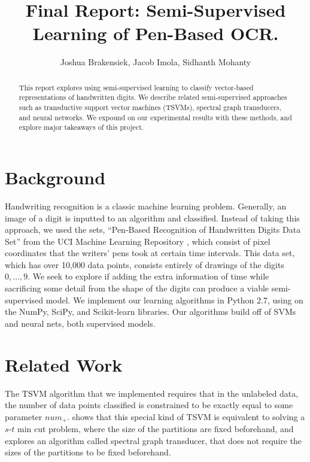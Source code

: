 \documentclass[11pt]{article}
\title{Final Report: Semi-Supervised Learning of Pen-Based OCR.}
\author{Joshua Brakensiek, Jacob Imola, Sidhanth Mohanty}
\begin{document}
\maketitle

\begin{abstract}

  This report explores using semi-supervised learning to classify vector-based representations of handwritten digits. We describe related semi-supervised approaches such as transductive support vector machines (TSVMs), spectral graph transducers, and neural networks. We expound on our experimental results with these methods, and explore major takeaways of this project.

\end{abstract}



\newcommand{\Seq}{\operatorname{Seq}}

\section{Background}

Handwriting recognition is a classic machine learning problem. Generally, an image of a digit is inputted to an algorithm and classified. Instead of taking this approach, we used the sets,  ``Pen-Based Recognition of Handwritten Digits Data Set'' \cite{Alpaydin:1998} from the UCI Machine Learning Repository \cite{Lichman:2013}, which consist of pixel coordinates that the writers' pens took at certain time intervals. This data set, which has over 10,000 data points, consists entirely of drawings of the digits $0, \hdots, 9$. We seek to explore if adding the extra information of time while sacrificing some detail from the shape of the digits can produce a viable semi-supervised model.  We implement our learning algorithms in Python 2.7, using on the NumPy, SciPy, and Scikit-learn libraries. Our algorithms build off of SVMs and neural nets, both supervised models.

\section{Related Work}

The TSVM algorithm that we implemented requires that in the unlabeled
data, the number of data points classified is constrained to be
exactly equal to some parameter $num_+$. \cite{joachims2003transductive}
shows that this special kind of TSVM is equivalent to solving
a $s$-$t$ min cut problem, where the size of the partitions are fixed beforehand, and explores an algorithm called spectral graph transducer,
that does not require the sizes of the partitions to be fixed beforehand.
\end{document}
